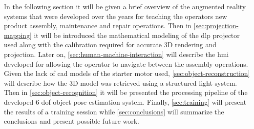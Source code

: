 In the following section it will be given a brief overview of the augmented reality systems that were developed over the years for teaching the operators new product assembly, maintenance and repair operations. Then in \cref{sec:projection-mapping} it will be introduced the mathematical modeling of the \gls{dlp} projector used along with the calibration required for accurate 3D rendering and projection. Later on, \cref{sec:human-machine-interaction} will describe the \gls{hmi} developed for allowing the operator to navigate between the assembly operations. Given the lack of \gls{cad} models of the starter motor used, \cref{sec:object-reconstruction} will describe how the 3D model was retrieved using a structured light system. Then in \cref{sec:object-recognition} it will be presented the processing pipeline of the developed 6 \gls{dof} object pose estimation system. Finally, \cref{sec:training} will present the results of a training session while \cref{sec:conclusions} will summarize the conclusions and present possible future work.
